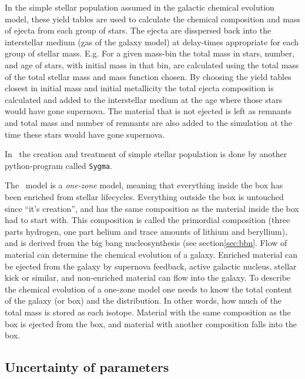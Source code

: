 In the simple stellar population assumed in the galactic chemical evolution model, these yield tables are used to calculate the chemical composition and mass of ejecta from each group of stars. The ejecta are disspersed back into the interstellar medium (gas of the galaxy model) at delay-times appropriate for each group of stellar mass.
E.g. For a given mass-bin the total mass in stars, number, and age of stars, with initial mass in that bin, are calculated using the total mass of the total stellar mass and mass function chosen. By choosing the yield tables closest in initial mass and initial metallicity the total ejecta composition is calculated and added to the interstellar medium at the age where those stars would have gone supernova.
The material that is not ejected is left as remnants and total mass and number of remnants are also added to the simulation at the time these stars would have gone supernova.

In \omegamodel\ the creation and treatment of simple stellar population is done by another python-program called \texttt{Sygma}.

The \omegamodel\ model is a \textit{one-zone} model, meaning that everything inside the box has been enriched from stellar lifecycles. Everything outside the box is untouched since ``it's creation'', and has the same composition as the material inside the box had to start with.
This composition is called the primordial composition (three parts hydrogen, one part helium and trace amounts of lithium and beryllium), and is derived from the big bang nucleosynthesis (see section\ref{sec:bbn}.
Flow of material can determine the chemical evolution of a galaxy. Enriched material can be ejected from the galaxy by supernova feedback, active galactic nucleus, stellar kick or similar, and non-enriched material can flow into the galaxy.
To describe the chemical evolution of a one-zone model one needs to know the total content of the galaxy (or box) and the distribution. In other words, how much of the total mass is stored as each isotope. Material with the same composition as the box is ejected from the box, and material with another composition falls into the box.



\subsection{Uncertainty of parameters}

